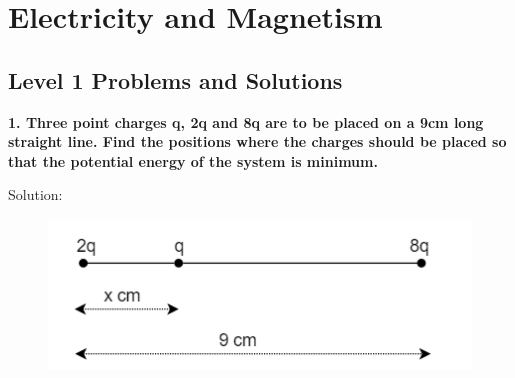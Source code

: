 \chapter{Electricity and Magnetism}

\pagestyle{fancy}
\fancyhf{}
\fancyhead[OC]{\leftmark}
\fancyhead[EC]{\rightmark}
\cfoot{\thepage}

\section{Level 1 Problems and Solutions}
\begin{tcolorbox}
\textbf{1. Three point charges q, 2q and 8q are to be placed on a 9cm long straight line. Find the positions where the charges should be placed so that the potential energy of the system is minimum.}
\end{tcolorbox}
Solution:
\begin{figure}[h]
    \centering
    \includegraphics[scale = 0.8]{figures/Sandesh's Figures/threePtChar.png}
    \label{fig3}
\end{figure}

